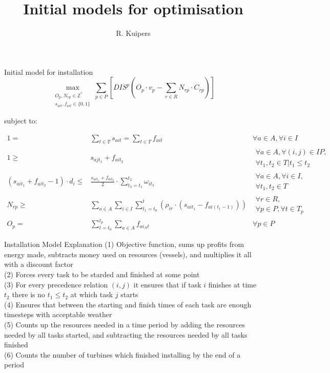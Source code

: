 \documentclass{beamer}
\title[Initial models for optimisation]{Initial models for optimisation}
\author{R. Kuipers}
\begin{document}
\begin{frame}
  \titlepage
\end{frame}

\begin{frame}{Initial model for installation}
\footnotesize
\begin{equation}
	\max_{\substack{O_p, N_{rp} \in \mathbb{Z}^* \\ s_{ait}, f_{ait} \in \{0, 1\}}} \sum_{p \in P} [ DIS^p (O_p \cdot v_p - \sum_{r \in R} N_{rp} \cdot C_{rp}) ]
\end{equation}

\bigskip
subject to:

\begin{align}
1 =& \sum_{t \in T} s_{ait}= \sum_{t \in T} f_{ait}									&	\forall a \in A, \forall i \in I 					\\
1 \geq& s_{ajt_1} + f_{ait_2}												&	\begin{aligned} \forall a \in A, \forall (i, j) \in IP, \\
																	\forall t_1, t_2 \in T | t_1 \leq t_2 \end{aligned} \\
(s_{ait_1} + f_{ait_2} - 1) \cdot d_i \leq& \frac{s_{ait_1} + f_{ait_2}}{2} \cdot \sum_{t_3 = t_1}^{t_2} \omega_{it_3} & \begin{aligned}\forall a \in A, \forall i \in I, \\ \forall t_1, t_2 \in T \end{aligned} \\
N_{rp} \geq& \sum_{a \in A}\sum_{i\in I} \sum_{t_1 = t_0}^t (\rho_{ir} \cdot (s_{ait_1} - f_{ai(t_1-1)}))	& 	\begin{aligned} \forall r \in R, \\ \forall p \in P, \forall t \in T_p \end{aligned} 	\\
O_p =&  \sum_{t = t_0}^{t_p} \sum_{a \in A}  f_{ai_Nt}								& \forall p \in P
\end{align}

\end{frame}

\begin{frame}{Installation Model Explanation}
(1) Objective function, sums up profits from energy made, subtracts money used on resources (vessels), and multiplies it all with a discount factor	\\
(2) Forces every task to be starded and finished at some point	\\
(3) For every precedence relation $(i, j)$ it ensures that if task $i$ finishes at time $t_2$ there is no $t_1 \leq t_2$ at which task $j$ starts 	\\
(4) Ensures that between the starting and finish times of each task are enough timesteps with acceptable weather	\\
(5) Counts up the resources needed in a time period by adding the resources needed by all tasks started, and subtracting the resources needed by all tasks finished	\\
(6) Counts the number of turbines which finished installing by the end of a period	
\end{frame}
\end{document}
